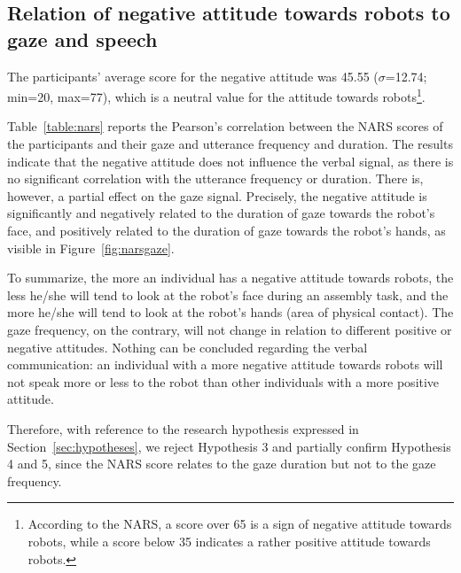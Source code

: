 \subsection{Relation of negative attitude towards robots to gaze and speech}\label{sec:nars}

The participants' average score for the negative attitude was 45.55 ($\sigma$=12.74; min=20, max=77), which is a neutral value for the attitude towards robots\footnote{According to the NARS, a score over 65 is a sign of negative attitude towards robots, while a score below 35 indicates a rather positive attitude towards robots.}. 

Table~\ref{table:nars} reports the Pearson's correlation between the NARS scores of the participants and their gaze and utterance frequency and duration. The results indicate that the negative attitude does not influence the verbal signal, as there is no significant correlation with the utterance frequency or duration. 
There is, however, a partial effect on the gaze signal. Precisely, the negative attitude is significantly and negatively related to the duration of gaze towards the robot's face, and positively related to the duration of gaze towards the robot's hands, as visible in Figure~\ref{fig:narsgaze}. 

To summarize, the more an individual has a negative attitude towards robots, the less he/she will tend to look at the robot's face during an assembly task, and the more he/she will tend to look at the robot's hands (area of physical contact). The gaze frequency, on the contrary, will not change in relation to different positive or negative attitudes. 
Nothing can be concluded regarding the verbal communication: an individual with a more negative attitude towards robots will not speak more or less to the robot than other individuals with a more positive attitude. 

Therefore, with reference to the research hypothesis expressed in Section~\ref{sec:hypotheses}, we reject Hypothesis 3
and partially confirm Hypothesis 4 and 5, since the NARS score relates to the gaze duration but not to the gaze frequency.


